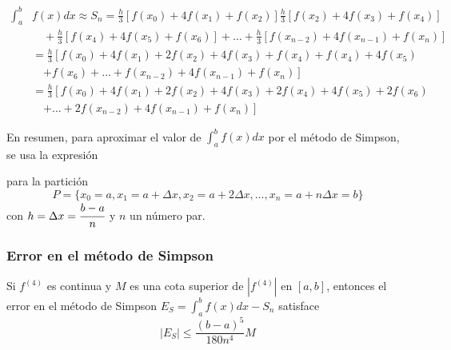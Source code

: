 {\small
\begin{align*}
\int_{a}^{b}&f(x)dx \approx S_{n} =\frac{h}{3}\left[f(x_{0})+4f(x_{1})+f(x_{2})\right] \frac{h}{3}\left[f(x_{2})+4f(x_{3})+f(x_{4})\right] \\ &\quad+\frac{h}{3}\left[f(x_{4})+4f(x_{5})+f(x_{6})\right] +\ldots %
+\frac{h}{3}\left[ f(x_{n-2})+4f(x_{n-1})+f(x_{n})\right] \\
&=\frac{h}{3}\left[f(x_{0})+4f(x_{1})+2f(x_{2})+4f(x_{3})+f(x_{4})+f(x_{4})+4f(x_{5})\right.\\
&\quad\left.+f(x_{6})+\ldots+f(x_{n-2})+4f(x_{n-1})+f(x_{n})\right] \\
&=\frac{h}{3}\left[f(x_{0})+4f(x_{1})+2f(x_{2})+4f(x_{3})+2f(x_{4})+4f(x_{5})+2f(x_{6})\right.\\
&\quad\left.+\ldots +2f(x_{n-2})+4f(x_{n-1})+f(x_{n})\right]
\end{align*}
}

En resumen, para aproximar el valor de $\int_{a}^{b}f(x)dx$ por el método de Simpson, se usa la expresión




para la partición
{\small
\[
P=\{x_{0}=a,x_{1}=a+\Delta x,x_{2}=a+2\Delta x,\ldots,x_{n}=a+n\Delta x=b\}
\]
}
con $h=\Delta x=\cfrac{b-a}{n}$ y $n$ un número par.

\subsubsection*{Error en el método de Simpson}

{ \textnormal{Si $f^{\left( 4\right) }$ es continua y $M$ es una cota superior de $%
\left\vert f^{\left( 4\right) }\right\vert $ en $\left[ a,b\right] $,
entonces el error en el método de Simpson $E_{S}=\int_{a}^{b}f(x)dx-S_{n}$
satisface}
\[
\left\vert E_{S}\right\vert \leq \frac{\left( b-a\right) ^{5}}{180n^{4}}M
\]
}

